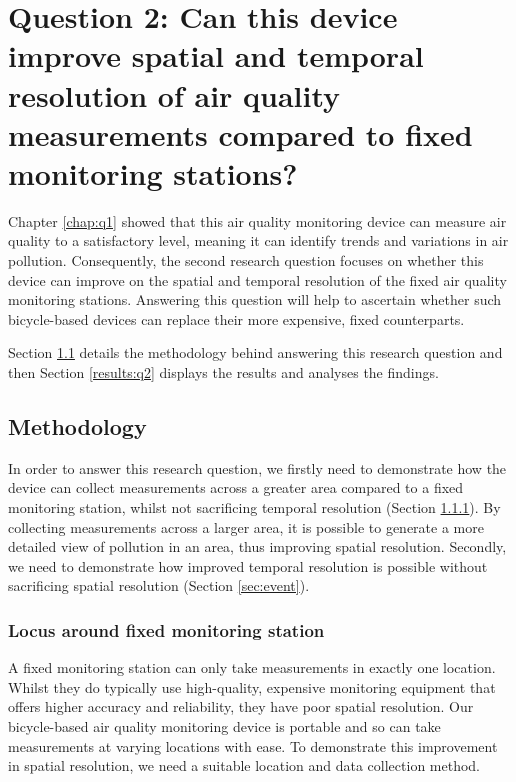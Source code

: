 \documentclass[11pt]{report}
\begin{document}

\chapter{Question 2: Can this device improve spatial and temporal resolution of air quality measurements compared to fixed monitoring stations?}  \label{chap:q2}

Chapter \ref{chap:q1} showed that this air quality monitoring device can measure air quality to a satisfactory level, meaning it can identify trends and variations in air pollution. Consequently, the second research question focuses on whether this device can improve on the spatial and temporal resolution of the fixed air quality monitoring stations. Answering this question will help to ascertain whether such bicycle-based devices can replace their more expensive, fixed counterparts.

Section \ref{meth:q2} details the methodology behind answering this research question and then Section \ref{results:q2} displays the results and analyses the findings.

\section{Methodology} \label{meth:q2}

In order to answer this research question, we firstly need to demonstrate how the device can collect measurements across a greater area compared to a fixed monitoring station, whilst not sacrificing temporal resolution (Section \ref{sec:locus}). By collecting measurements across a larger area, it is possible to generate a more detailed view of pollution in an area, thus improving spatial resolution. Secondly, we need to demonstrate how improved temporal resolution is possible without sacrificing spatial resolution (Section \ref{sec:event}). 

\subsection{Locus around fixed monitoring station} \label{sec:locus}

A fixed monitoring station can only take measurements in exactly one location. Whilst they do typically use high-quality, expensive monitoring equipment that offers higher accuracy and reliability, they have poor spatial resolution. Our bicycle-based air quality monitoring device is portable and so can take measurements at varying locations with ease. To demonstrate this improvement in spatial resolution, we need a suitable location and data collection method. 
\end{document}
